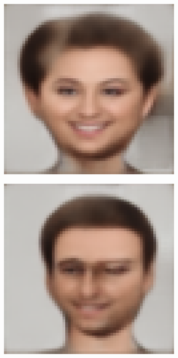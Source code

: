 \documentclass{IEEEcsmag}
\begin{document}
\begin{figure}[ht]
    \smallskip
    \setcounter{subfigure}{0}  %

    \begin{subfigure}{0.12\textwidth}
        \includegraphics[width=\linewidth]{Prompted/generated_images/image4.webp_AE.png}
    \end{subfigure}
    \begin{subfigure}{0.12\textwidth}
        \includegraphics[width=\linewidth]{Digital sketches/generated_images/image16.jpeg_AE.png}

\end{subfigure}
\end{figure}
\end{document}
